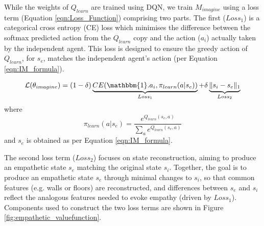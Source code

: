 
While the weights of $Q_{learn}$ are trained using DQN, we train $M_{imagine}$ using a loss term (Equation \ref{eqn:Loss_Function}) comprising two parts. The first ($Loss_{1}$) is a categorical cross entropy (CE) loss which minimises the difference between the softmax predicted action from the $Q_{learn}$ copy and the action ($a_{i}$) actually taken by the independent agent. %
This loss is designed to ensure the greedy action of $Q_{learn}$, for $s_{e}$, matches the independent agent's action (per Equation \ref{eqn:IM_formula}).

\begin{equation}
\label{eqn:Loss_Function}
\begin{aligned}\mathcal{L}(\theta_{imagine}) = (1-\delta)\underbrace{CE(\mathbbm{1}.a_{i},\pi_{learn}(a|s_{e}))}_{Loss_{1}}
+ \delta\underbrace{\|{s_{i}-s_{e}}\|_{1}}_{Loss_{2}}
\end{aligned}
\end{equation}
where
\begin{equation}
\pi_{learn}(a|s_{e})=\frac{e^{Q_{learn}(s_{e},a)}}{\sum_{a}e^{Q_{learn}(s_{e},a)}}
\end{equation}
and $s_{e}$ is obtained as per Equation \ref{eqn:IM_formula}.

The second loss term ($Loss_{2}$) focuses on state reconstruction, aiming to produce an empathetic state $s_{e}$ matching the original state $s_{i}$. Together, the goal is to produce an empathetic state $s_{e}$ through minimal changes to $s_{i}$, so that common features (e.g. walls or floors) are reconstructed, and differences between $s_{e}$ and $s_{i}$ reflect the analogous features  
needed to evoke empathy (driven by $Loss_{1}$). 
Components used to construct the two loss terms are shown in Figure \ref{fig:empathetic_valuefunction}.

